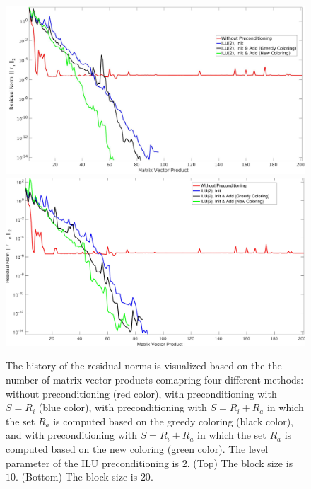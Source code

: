 \documentclass[12pt, twoside,a4paper,toc=bibliography]{scrbook}
\begin{document}
\begin{figure}
\centering
\includegraphics[width=\linewidth]{jac_convergence_greedy_new.jpg}
\vfill
\includegraphics[width=\linewidth]{jac_convergence_greedy_new_bl20.jpg}
\caption{
The history of the residual norms is visualized based on the 
the number of matrix-vector products comapring four different methods:
without preconditioning (red color), 
with preconditioning with $S=R_i$ (blue color),
with preconditioning with $S=R_i + R_a$ in which 
the set $R_a$ is computed based on the greedy coloring (black color),
and with preconditioning with $S=R_i + R_a$ in which 
the set $R_a$ is computed based on the new coloring (green color).
The level parameter of the ILU preconditioning is $2$.
(Top) The block size is $10$. 
(Bottom) The block size is $20$.
}
\label{f.convergence_greedy_new2}
\end{figure}

\end{document}

